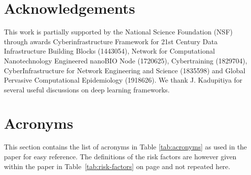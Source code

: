 \documentclass[a4paper, inpress]{jds} %
\renewcommand{\_}{%
    \textunderscore\hspace{0pt}%
}
\begin{document}
%
%

\section*{Acknowledgements}

This work is partially supported by the National Science Foundation
(NSF) through awards Cyberinfrastructure Framework for 21st Century
Data Infrastructure Building Blocks (1443054), Network for
Computational Nanotechnology Engineered nanoBIO Node (1720625),
Cybertraining (1829704), CyberInfrastructure for Network Engineering
and Science (1835598) and Global Pervasive Computational Epidemiology
(1918626).  We thank J. Kadupitiya for several useful discussions on
deep learning frameworks.

\clearpage

\section*{Acronyms}

This section contains the list of acronyms in Table \ref{tab:acronyms}
as used in the paper for easy reference. The definitions of the risk
factors are however given within the paper in
Table~\ref{tab:risk-factors} on page \pageref{tab:risk-factors} and
not repeated here.
\end{document}
